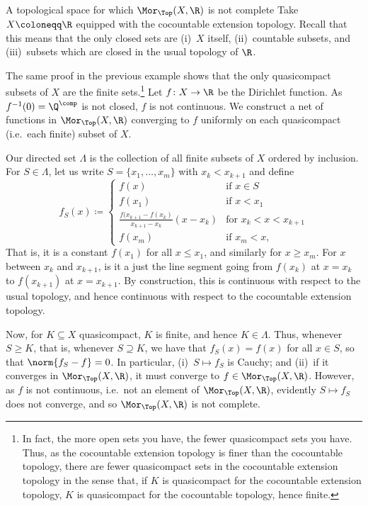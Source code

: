 \begin{exm}{A topological space for which $\Mor _{\Top}(X,\R )$ is not complete}{}
Take $X\coloneqq \R$ equipped with the cocountable extension topology.  Recall that this means that the only closed sets are (i)~$X$ itself, (ii)~countable subsets, and (iii)~subsets which are closed in the usual topology of $\R$.

The same proof in the previous example shows that the only quasicompact subsets of $X$ are the finite sets.\footnote{In fact, the more open sets you have, the fewer quasicompact sets you have.  Thus, as the cocountable extension topology is finer than the cocountable topology, there are fewer quasicompact sets in the cocountable extension topology in the sense that, if $K$ is quasicompact for the cocountable extension topology, $K$ is quasicompact for the cocountable topology, hence finite.}  Let $f\colon X\rightarrow \R$ be the Dirichlet function.  As $f^{-1}(0)=\Q ^{\comp}$ is not closed, $f$ is not continuous.  We construct a net of functions in $\Mor _{\Top}(X,\R )$ converging to $f$ uniformly on each quasicompact (i.e.~each finite) subset of $X$.

Our directed set $\Lambda$ is the collection of all finite subsets of $X$ ordered by inclusion.  For $S\in \Lambda$, let us write $S=\{ x_1,\ldots ,x_m\}$ with $x_k<x_{k+1}$ and define
\begin{equation}
f_S(x)\coloneqq \begin{cases}f(x) & \text{if }x\in S \\ f(x_1) & \text{if }x<x_1 \\ \frac{f(x_{k+1}-f(x_k)}{x_{k+1}-x_k}(x-x_k) & \text{for }x_k<x<x_{k+1} \\ f(x_m) & \text{if }x_m<x,\end{cases}
\end{equation}
That is, it is a constant $f(x_1)$ for all $x\leq x_1$, and similarly for $x\geq x_m$.  For $x$ between $x_k$ and $x_{k+1}$, is it a just the line segment going from $f(x_k)$ at $x=x_k$ to $f(x_{k+1})$ at $x=x_{k+1}$.  By construction, this is continuous with respect to the usual topology, and hence continuous with respect to the cocountable extension topology.

Now, for $K\subseteq X$ quasicompact, $K$ is finite, and hence $K\in \Lambda$.  Thus, whenever $S\geq K$, that is, whenever $S\supseteq K$, we have that $f_S(x)=f(x)$ for all $x\in S$, so that $\norm{f_S-f}=0$.  In particular, (i)~$S\mapsto f_S$ is Cauchy; and (ii)~if it converges in $\Mor _{\Top}(X,\R )$, it must converge to $f\in \Mor _{\Top}(X,\R )$.  However, as $f$ is not continuous, i.e.~not an element of $\Mor _{\Top}(X,\R )$, evidently $S\mapsto f_S$ does not converge, and so $\Mor _{\Top}(X,\R )$ is not complete.
\end{exm}
